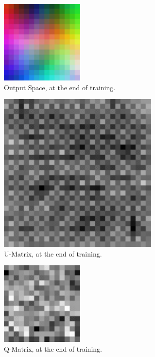 \documentclass[journal]{IEEEtran}
\begin{document}
\begin{figure}[h!]
  \centering
  \includegraphics[width=0.4\linewidth]{./images/som_training/3_som.pdf}
  \caption{Output Space, at the end of training.}
  \label{chp3:threesom}
\end{figure}

\begin{figure}[h!]
  \centering
  \includegraphics[width=0.4\linewidth]{./images/som_training/3_umatrix.pdf}
  \caption{U-Matrix, at the end of training.}
  \label{chp3:threematrix}
\end{figure}

\begin{figure}[h!]
  \centering
  \includegraphics[width=0.4\linewidth]{./images/som_training/3_quantmatrix.pdf}
  \caption{ Q-Matrix, at the end of training.}
  \label{chp3:threetopmat}
\end{figure}
 
\end{document}

